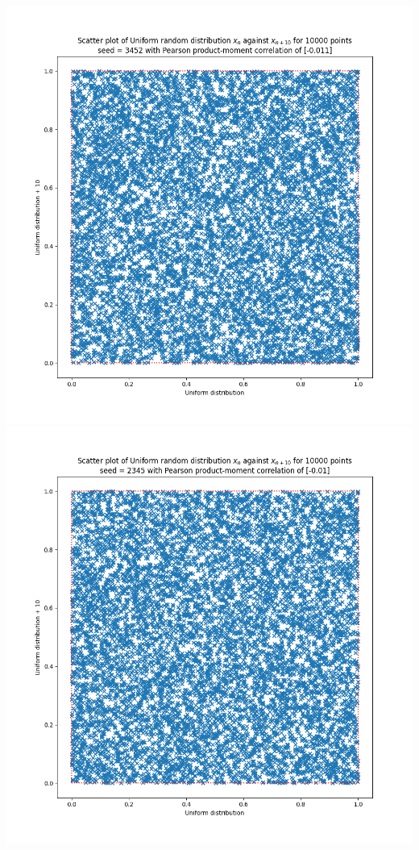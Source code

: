 \documentclass[12pt, A4]{article}
\begin{document}
\begin{center}
\includegraphics[scale=0.35]{Task_1_Scatter}
\includegraphics[scale=0.35]{Task_1_Scatter1}
\end{center}
\end{document}
